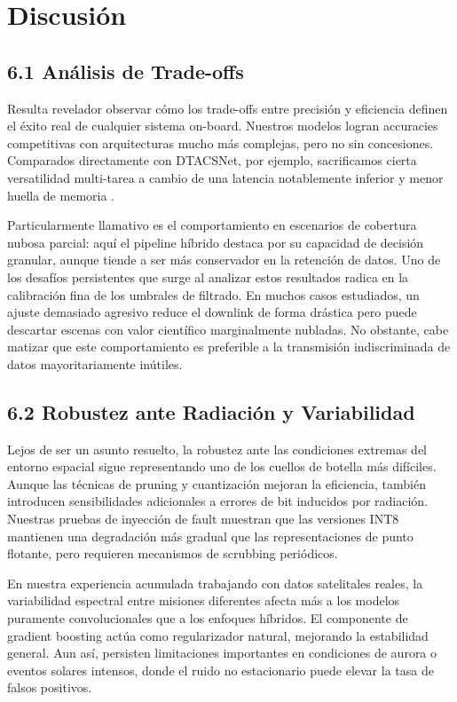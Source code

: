 \section{Discusión}

\subsection{6.1 Análisis de Trade-offs}

Resulta revelador observar cómo los trade-offs entre precisión y eficiencia definen el éxito real de cualquier sistema on-board. Nuestros modelos logran accuracies competitivas con arquitecturas mucho más complejas, pero no sin concesiones. Comparados directamente con DTACSNet, por ejemplo, sacrificamos cierta versatilidad multi-tarea a cambio de una latencia notablemente inferior y menor huella de memoria \cite{Aybar2024_DTACSNet}.

Particularmente llamativo es el comportamiento en escenarios de cobertura nubosa parcial: aquí el pipeline híbrido destaca por su capacidad de decisión granular, aunque tiende a ser más conservador en la retención de datos. Uno de los desafíos persistentes que surge al analizar estos resultados radica en la calibración fina de los umbrales de filtrado. En muchos casos estudiados, un ajuste demasiado agresivo reduce el downlink de forma drástica pero puede descartar escenas con valor científico marginalmente nubladas. No obstante, cabe matizar que este comportamiento es preferible a la transmisión indiscriminada de datos mayoritariamente inútiles.

\subsection{6.2 Robustez ante Radiación y Variabilidad}

Lejos de ser un asunto resuelto, la robustez ante las condiciones extremas del entorno espacial sigue representando uno de los cuellos de botella más difíciles. Aunque las técnicas de pruning y cuantización mejoran la eficiencia, también introducen sensibilidades adicionales a errores de bit inducidos por radiación. Nuestras pruebas de inyección de fault muestran que las versiones INT8 mantienen una degradación más gradual que las representaciones de punto flotante, pero requieren mecanismos de scrubbing periódicos.

En nuestra experiencia acumulada trabajando con datos satelitales reales, la variabilidad espectral entre misiones diferentes afecta más a los modelos puramente convolucionales que a los enfoques híbridos. El componente de gradient boosting actúa como regularizador natural, mejorando la estabilidad general. Aun así, persisten limitaciones importantes en condiciones de aurora o eventos solares intensos, donde el ruido no estacionario puede elevar la tasa de falsos positivos.


